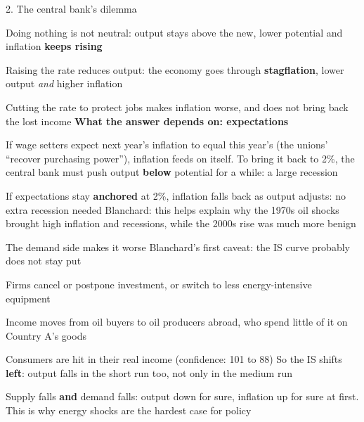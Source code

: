 \documentclass[aspectratio=169,xcolor=table]{beamer}
\begin{document}
\begin{frame}{2. The central bank's dilemma}
\footnotesize
\bi
  \item Doing nothing is not neutral: output stays above the new, lower potential and inflation \textbf{keeps rising}
  \item Raising the rate reduces output: the economy goes through \textbf{stagflation}, lower output \emph{and} higher inflation
  \item Cutting the rate to protect jobs makes inflation worse, and does not bring back the lost income
\ei
\vspace{0.1cm}
\textbf{What the answer depends on: expectations}
\bi
  \item If wage setters expect next year's inflation to equal this year's (the unions' ``recover purchasing power''), inflation feeds on itself. To bring it back to 2\%, the central bank must push output \textbf{below} potential for a while: a large recession
  \item If expectations stay \textbf{anchored} at 2\%, inflation falls back as output adjusts: no extra recession needed
\ei
\vspace{0.05cm}
Blanchard: this helps explain why the 1970s oil shocks brought high inflation and recessions, while the 2000s rise was much more benign
\end{frame}

\begin{frame}{The demand side makes it worse}
\small
Blanchard's first caveat: the IS curve probably does not stay put
\bi
  \item Firms cancel or postpone investment, or switch to less energy-intensive equipment
  \item Income moves from oil buyers to oil producers abroad, who spend little of it on Country A's goods
  \item Consumers are hit in their real income (confidence: 101 to 88)
\ei
\vspace{0.1cm}
So the IS shifts \textbf{left}: output falls in the short run too, not only in the medium run
\vspace{0.15cm}

\begin{block}{}
Supply falls \textbf{and} demand falls: output down for sure, inflation up for sure at first. This is why energy shocks are the hardest case for policy
\end{block}
\end{frame}
\end{document}
